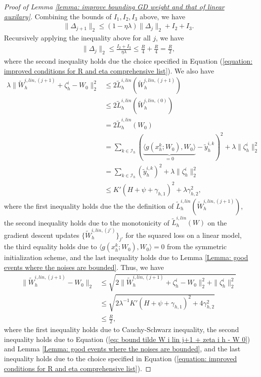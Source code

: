 \documentclass{article} \usepackage{iclr2023/iclr2023_conference,times}
\begin{document}
\begin{proof}[Proof of Lemma \ref{lemma: improve bounding GD weight and that of linear auxilary}]
Combining the bounds of $I_1, I_2, I_3$ above, we have 
\begin{align*}
    \| \Delta_{j+1} \|_2 \leq (1 - \eta \lambda) \| \Delta_j \|_2 + I_2 + I_3.
\end{align*}
Recursively applying the inequality above for all $j$, we have 
\begin{align}
    \| \Delta_j \|_2 \leq \frac{I_2 + I_3}{ \eta \lambda } \leq \frac{R}{4} + \frac{R}{4} = \frac{R}{2}, 
    \label{eq: bound Delta j by R/2}
\end{align}
where the second inequality holds due the choice specified in Equation (\ref{equation: improved conditions for R and eta comprehensive list}). We also have 
\begin{align}
    \lambda \| \tilde{W}^{i,lin,(j+1)}_h + \zeta^i_h - W_0 \|_2^2 &\leq 2 \tilde{L}_h^{i, lin}(\tilde{W}^{i,lin,(j+1)}_h) \nonumber\\ 
    &\leq  2 \tilde{L}_h^{i, lin}(\tilde{W}^{i,lin,(0)}_h) \nonumber\\
    &= 2 \tilde{L}_h^{i, lin}(W_0) \nonumber\\
    &=  \sum_{k \in \mathcal{I}_h} \left( \underbrace{\langle g(x^k_h; W_0), W_0  \rangle}_{=0} -  \tilde{y}^{i,k}_h \right)^2 +\lambda \|  \zeta^i_h  \|_2^2 \nonumber\\
    &=  \sum_{k \in \mathcal{I}_h}  (\tilde{y}^{i,k}_h)^2 +\lambda \|  \zeta^i_h  \|_2^2 \nonumber\\
    &\leq K' (H + \psi + \gamma_{h,1})^2 + \lambda \gamma_{h,2}^2,
    \label{eq: bound tilde W i lin j+1 + zeta i h - W 0}
\end{align}
where the first inequality holds due the the definition of $\tilde{L}_h^{i, lin}(\tilde{W}^{i,lin,(j+1)}_h)$, the second inequality holds due to the monotonicity of $\tilde{L}_h^{i, lin}(W)$ on the gradient descent updates $\{\tilde{W}^{i,lin,(j')}_h\}_{j'}$ for the squared loss on a linear model, the third equality holds due to $\langle g(x^k_h; W_0), W_0  \rangle = 0$ from the symmetric initialization scheme, and the last inequality holds due to Lemma \ref{Lemma: good events where the noises are bounded}. Thus, we have
\begin{align}
     \| \tilde{W}^{i,lin,(j+1)}_h  - W_0 \|_2 &\leq \sqrt{ 2\| \tilde{W}^{i,lin,(j+1)}_h + \zeta^i_h - W_0 \|_2^2 + \| \zeta^i_h \|_2^2 } \nonumber\\ 
     &\leq \sqrt{2\lambda^{-1}K' (H + \psi + \gamma_{h,1})^2 + 4 \gamma_{h,2}^2} \nonumber \\ 
     &\leq \frac{R}{2},
     \label{eq: tilde W i lin j+1 - W0}
\end{align}
where the first inequality holds due to Cauchy-Schwarz inequality, the second inequality holds due to Equation (\ref{eq: bound tilde W i lin j+1 + zeta i h - W 0}) and Lemma \ref{Lemma: good events where the noises are bounded}, and the last inequality holds due to the choice specified in Equation (\ref{equation: improved conditions for R and eta comprehensive list}). 


\end{proof}
\end{document}
